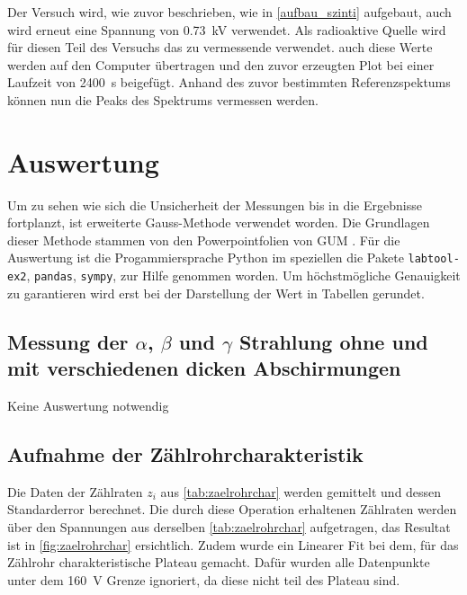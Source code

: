 \documentclass[12pt,english,ngerman]{scrartcl}
\begin{document}
Der Versuch wird, wie zuvor beschrieben, wie in \autoref{aufbau_szinti}
aufgebaut, auch wird erneut eine Spannung von \SI{0.73}{\kilo\volt} verwendet.
Als radioaktive Quelle wird für diesen Teil des Versuchs das zu vermessende
 verwendet. auch diese Werte werden auf den Computer
übertragen und den zuvor erzeugten Plot bei einer Laufzeit von
\SI{2400}{\second} beigefügt. Anhand des zuvor bestimmten Referenzspektums
können nun die Peaks des  Spektrums vermessen werden.


\section{Auswertung}\label{sec:Auswertung}

Um zu sehen wie sich die Unsicherheit der Messungen bis in die
Ergebnisse fortplanzt, ist erweiterte Gauss-Methode verwendet
worden. Die Grundlagen dieser Methode stammen von den Powerpointfolien von
GUM \cite{WolfgangKessel2004}. Für die Auswertung ist die Progammiersprache Python
im speziellen die Pakete \verb#labtool-ex2#, \verb#pandas#, \verb#sympy#, zur
Hilfe genommen worden. Um höchstmögliche Genauigkeit zu garantieren wird
erst bei der Darstellung der Wert in Tabellen gerundet.

\subsection{Messung der \texorpdfstring{$\alpha$}{alpha}, \texorpdfstring{$\beta$}{beta} und
\texorpdfstring{$\gamma$}{gamma} Strahlung ohne und mit verschiedenen dicken Abschirmungen}

Keine Auswertung notwendig


\subsection{Aufnahme der Zählrohrcharakteristik}

Die Daten der Zählraten $z_i$ aus \autoref{tab:zaelrohrchar} werden gemittelt und
dessen Standarderror berechnet. Die durch diese Operation erhaltenen Zählraten
werden über den Spannungen aus derselben \autoref{tab:zaelrohrchar}
aufgetragen, das Resultat ist in \autoref{fig:zaelrohrchar} ersichtlich. Zudem
wurde ein Linearer Fit bei dem, für das Zählrohr charakteristische Plateau gemacht.
Dafür wurden alle Datenpunkte unter dem \SI{160}{\volt} Grenze ignoriert, da diese
nicht teil des Plateau sind.
\end{document}
